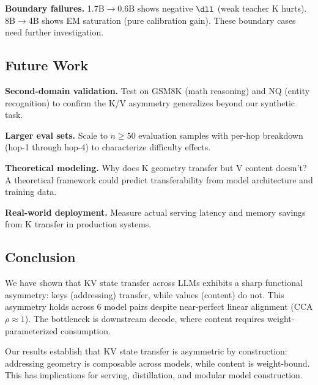 \textbf{Boundary failures.}
1.7B$\to$0.6B shows negative $\dll$ (weak teacher K hurts).
8B$\to$4B shows EM saturation (pure calibration gain).
These boundary cases need further investigation.

\subsection{Future Work}

\textbf{Second-domain validation.}
Test on GSM8K (math reasoning) and NQ (entity recognition)
to confirm the K/V asymmetry generalizes beyond our synthetic task.

\textbf{Larger eval sets.}
Scale to $n \geq 50$ evaluation samples with per-hop breakdown
(hop-1 through hop-4) to characterize difficulty effects.

\textbf{Theoretical modeling.}
Why does K geometry transfer but V content doesn't?
A theoretical framework could predict transferability
from model architecture and training data.

\textbf{Real-world deployment.}
Measure actual serving latency and memory savings
from K transfer in production systems.

\subsection{Conclusion}

We have shown that KV state transfer across LLMs exhibits
a sharp functional asymmetry:
keys (addressing) transfer, while values (content) do not.
This asymmetry holds across 6 model pairs despite
near-perfect linear alignment (CCA $\rho \approx 1$).
The bottleneck is downstream decode,
where content requires weight-parameterized consumption.

Our results establish that KV state transfer is asymmetric by construction:
addressing geometry is composable across models,
while content is weight-bound.
This has implications for serving, distillation,
and modular model construction.
